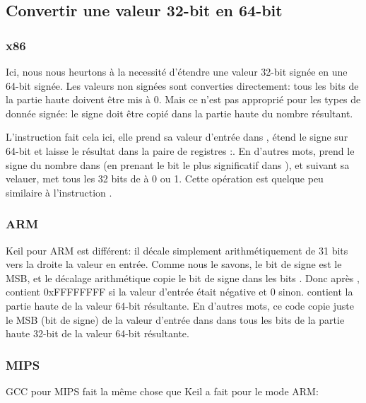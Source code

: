 ﻿\subsection{Convertir une valeur 32-bit en 64-bit}
\label{subsec:sign_extending_32_to_64}



\subsubsection{x86}



Ici, nous nous heurtons à la necessité d'étendre une valeur 32-bit signée en une
64-bit signée.
Les valeurs non signées sont converties directement: tous les bits de la partie haute
doivent être mis à 0.
Mais ce n'est pas approprié pour les types de donnée signée: le signe doit être copié
dans la partie haute du nombre résultant.

L'instruction  fait cela ici, elle prend sa valeur d'entrée dans \EAX{},
étend le signe sur 64-bit et laisse le résultat dans la paire de registres \EDX{}:\EAX{}.
En d'autres mots,  prend le signe du nombre dans \EAX{} (en prenant le bit
le plus significatif dans \EAX{}), et suivant sa velauer, met tous les 32 bits de
\EDX{} à 0 ou 1.
Cette opération est quelque peu similaire à l'instruction \MOVSX{}.

\subsubsection{ARM}



Keil pour ARM est différent: il décale simplement arithmétiquement de 31 bits vers
la droite la valeur en entrée.
Comme nous le savons, le bit de signe est le \ac{MSB}, et le décalage arithmétique
copie le bit de signe dans les bits .
Donc après ,  contient 0xFFFFFFFF si la valeur d'entrée
était négative et 0 sinon.
 contient la partie haute de la valeur 64-bit résultante.
En d'autres mots, ce code copie juste le \ac{MSB} (bit de signe) de la valeur d'entrée
dans  dans tous les bits de la partie haute 32-bit de la valeur 64-bit résultante.

\subsubsection{MIPS}

GCC pour MIPS fait la même chose que Keil a fait pour le mode ARM:


